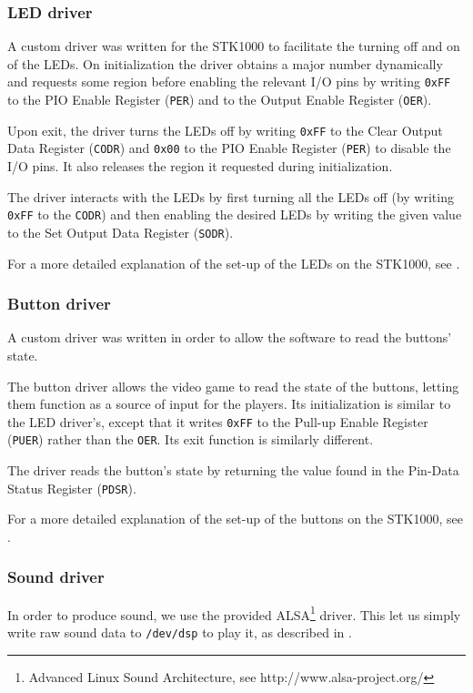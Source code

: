 \subsubsection{LED driver}
A custom driver was written for the STK1000 to facilitate the turning off and on of the LEDs.
On initialization the driver obtains a major number dynamically and requests some region before enabling the relevant I/O pins by writing \texttt{0xFF} to the PIO Enable Register (\texttt{PER}) and to the Output Enable Register (\texttt{OER}).

Upon exit, the driver turns the LEDs off by writing \texttt{0xFF} to the Clear Output Data Register (\texttt{CODR}) and \texttt{0x00} to the PIO Enable Register (\texttt{PER}) to disable the I/O pins.
It also releases the region it requested during initialization.

The driver interacts with the LEDs by first turning all the LEDs off (by writing \texttt{0xFF} to the \texttt{CODR}) and then enabling the desired LEDs by writing the given value to the Set Output Data Register (\texttt{SODR}).


For a more detailed explanation of the set-up of the LEDs on the STK1000, see \cite{tdt4258-1}.
\subsubsection{Button driver}
A custom driver was written in order to allow the software to read the buttons' state.

The button driver allows the video game to read the state of the buttons, letting them function as a source of input for the players.
Its initialization is similar to the LED driver's, except that it writes \texttt{0xFF} to the Pull-up Enable Register (\texttt{PUER}) rather than the \texttt{OER}.
Its exit function is similarly different.

The driver reads the button's state by returning the value found in the Pin-Data Status Register (\texttt{PDSR}).


For a more detailed explanation of the set-up of the buttons on the STK1000, see \cite{tdt4258-1}.	
\subsubsection{Sound driver}
In order to produce sound, we use the provided ALSA\footnote{Advanced Linux Sound Architecture, see http://www.alsa-project.org/} driver.
This let us simply write raw sound data to \texttt{/dev/dsp} to play it, as described in \cite{lab-compendium}.

